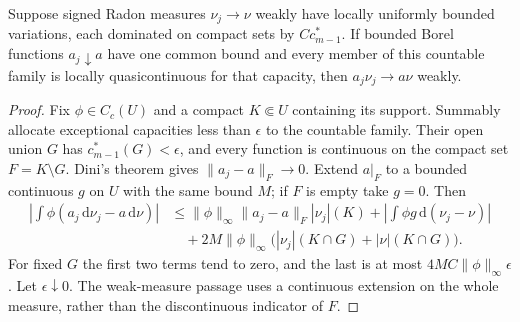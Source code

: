 \begin{lemma}\label{draft621:weighted-measure-convergence}
Suppose signed Radon measures $\nu_j\to\nu$ weakly have locally
uniformly bounded variations, each dominated on compact sets by
$C c_{m-1}^*$. If bounded Borel functions $a_j\downarrow a$ have
one common bound and every member of this countable family is
locally quasicontinuous for that capacity, then
$a_j\nu_j\to a\nu$ weakly.
\end{lemma}
\begin{proof}
Fix $\phi\in C_c(U)$ and a compact $K\Subset U$ containing its
support. Summably allocate exceptional capacities less than
$\epsilon$ to the countable family. Their open union $G$ has
$c_{m-1}^*(G)<\epsilon$, and every function is continuous on
the compact set $F=K\setminus G$. Dini's theorem gives
$\|a_j-a\|_F\to0$. Extend $a|_F$ to a bounded continuous $g$ on
$U$ with the same bound $M$; if $F$ is empty take $g=0$.
Then
\[
 \begin{split}
 \left|\int\phi(a_j\,\mathrm d\nu_j-a\,\mathrm d\nu)\right|
 &\leq\|\phi\|_\infty\|a_j-a\|_F|\nu_j|(K)
          +\left|\int\phi g\,\mathrm d(\nu_j-\nu)\right|\\
 &\quad+2M\|\phi\|_\infty
                 \bigl(|\nu_j|(K\cap G)+|\nu|(K\cap G)\bigr).
 \end{split}
\]
For fixed $G$ the first two terms tend to zero, and the last is
at most $4MC\|\phi\|_\infty\epsilon$. Let $\epsilon\downarrow0$.
The weak-measure passage uses a continuous extension on the whole
measure, rather than the discontinuous indicator of $F$.
\end{proof}

